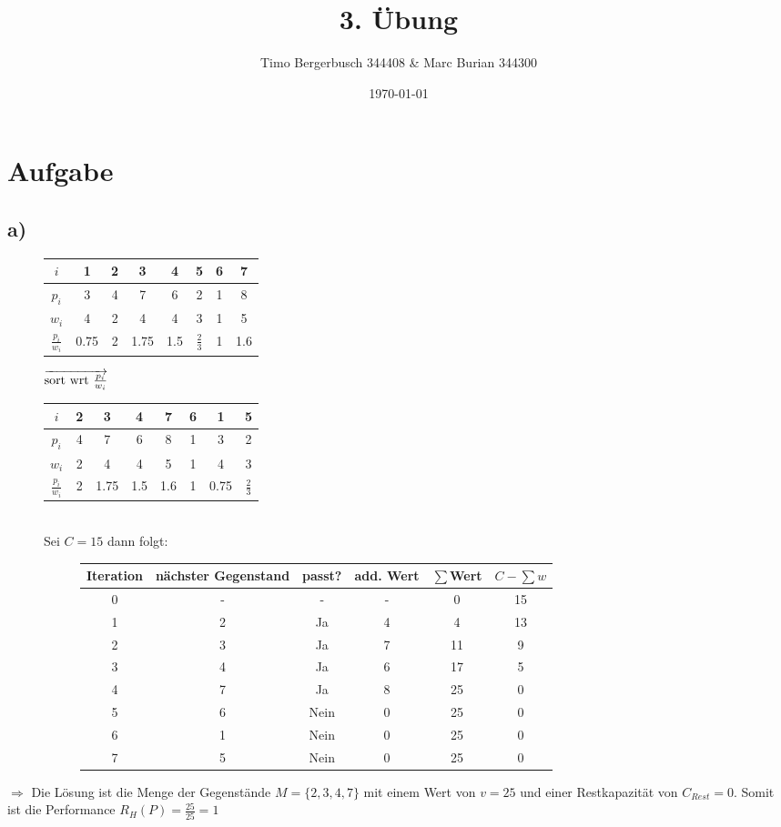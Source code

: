 \documentclass[12pt]{article}
\begin{document}
	
	\title{3. Übung}
	\author{Timo Bergerbusch 344408 \& Marc Burian 344300}
	\date{\specialdate\today}
	\maketitle
	
	
	\section{Aufgabe}
	\subsection{a)}
	
	\begin{figure}[H]
		\centering
		\begin{tabular}{c | c c c c c c c}
			$i$ & 1 & 2 & 3 & 4 & 5 & 6 & 7 \\ \hline
			$p_i$ & 3 & 4 & 7 & 6 & 2 & 1 & 8\\
			$w_i$ & 4 & 2 & 4 & 4 & 3 & 1 & 5\\
			$\frac{p_i}{w_i}$ & 0.75 & 2 & 1.75 & 1.5 & $\frac{2}{3}$ & 1 & 1.6 \\
		\end{tabular}
		 $\overrightarrow{$sort wrt $\frac{p_i}{w_i}}$ 
		 \begin{tabular}{c | c c c c c c c}
		 	$i$ 				&	2	& 3 	& 4 	& 7	& 6 &	1		& 5 			\\ \hline
		 	$p_i$ 				&	4	& 7 	& 6 	& 8 & 1 &	3 		& 2 			\\
		 	$w_i$ 				&	2	& 4 	& 4 	& 5 & 1 &	4		& 3 			\\
		 	$\frac{p_i}{w_i}$ 	&	2	& 1.75 	& 1.5 	& 1.6 & 1 &	0.75	& $\frac{2}{3}$ \\
		 \end{tabular}
		 \\
		 Sei $C=15$ dann folgt:
		 
		 \begin{figure}[H]
		 	\centering
		 	\begin{tabular}{c | c c c c c}
		 		Iteration & nächster Gegenstand & passt? & add. Wert & $\sum$Wert & $C-\sum w$ \\ \hline
		 		0 & - & - & - & 0 & 15 \\
		 		1 & 2 & Ja & 4 & 4 & 13 \\
		 		2 & 3 & Ja & 7 & 11 & 9 \\
		 		3 & 4 & Ja & 6 & 17 & 5 \\
		 		4 & 7 & Ja & 8 & 25 & 0 \\
		 		5 & 6 & Nein & 0 & 25 & 0 \\
		 		6 & 1 & Nein & 0 & 25 & 0 \\
		 		7 & 5 & Nein & 0 & 25 & 0 \\
		 	\end{tabular}
		\end{figure}
	\end{figure}
	$\Rightarrow$ Die Lösung ist die Menge der Gegenstände $M=\{2,3,4,7\}$ mit einem Wert von $v=25$ und einer Restkapazität von $C_{Rest}=0$. Somit ist die Performance $R_H(P)=\frac{25}{25}=1$
	
\end{document}
